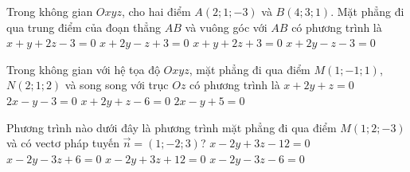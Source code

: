 \begin{ex}%
	Trong không gian $Oxyz$, cho hai điểm $A(2; 1;-3)$ và $B(4; 3; 1)$. Mặt phẳng đi qua trung điểm của đoạn thẳng $AB$ và vuông góc  với $AB$ có phương trình là
	 \choice
		{\True $x+y+2z-3=0$} 
		{$x+2y-z+3=0$} 
		 {$x+y+2z+3=0$}
		{$x+2y-z-3=0$} 
\end{ex}

\begin{ex}%
	Trong  không gian với hệ tọa độ $Oxyz$, mặt phẳng đi qua điểm $M(1;-1;1)$, $N(2;1;2)$ và song song với trục $Oz$ có phương trình là
	 \choice
		{$x + 2y + z =  0$}
		{\True $2x - y -  3 = 0$}
		 {$x + 2y + z - 6 = 0$}
		 {$2x - y + 5 = 0$}
\end{ex}

\begin{ex}%
	Phương trình nào dưới đây là phương trình mặt phẳng đi qua điểm $M(1; 2;-3)$ và có vectơ pháp  tuyến $\overrightarrow{n}=(1;-2; 3)$?
	 \choice
		 {$x-2 y+3 z-12=0$}
		{$x-2  y-3 z+6=0$}
		{\True $x-2  y+3 z+12=0$}
		{$x-2 y-3 z-6=0$} 
\end{ex}

